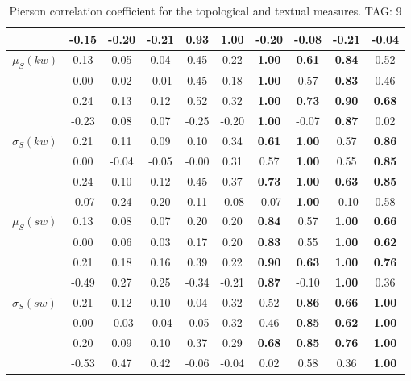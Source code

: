\begin{table*}[h!]
\begin{center}
\begin{tabular}{| l || c | c | c | c | c | c | c | c | c |}
 & -0.15 & -0.20 & -0.21 & {\bf 0.93} & {\bf 1.00} & -0.20 & -0.08 & -0.21 & -0.04 \\\hline
$\mu_S(kw)$ & 0.13 & 0.05 & 0.04 & 0.45 & 0.22 & {\bf 1.00} & {\bf 0.61} & {\bf 0.84} & 0.52 \\
 & 0.00 & 0.02 & -0.01 & 0.45 & 0.18 & {\bf 1.00} & 0.57 & {\bf 0.83} & 0.46 \\
 & 0.24 & 0.13 & 0.12 & 0.52 & 0.32 & {\bf 1.00} & {\bf 0.73} & {\bf 0.90} & {\bf 0.68} \\
 & -0.23 & 0.08 & 0.07 & -0.25 & -0.20 & {\bf 1.00} & -0.07 & {\bf 0.87} & 0.02 \\\hline
$\sigma_S(kw)$ & 0.21 & 0.11 & 0.09 & 0.10 & 0.34 & {\bf 0.61} & {\bf 1.00} & 0.57 & {\bf 0.86} \\
 & 0.00 & -0.04 & -0.05 & -0.00 & 0.31 & 0.57 & {\bf 1.00} & 0.55 & {\bf 0.85} \\
 & 0.24 & 0.10 & 0.12 & 0.45 & 0.37 & {\bf 0.73} & {\bf 1.00} & {\bf 0.63} & {\bf 0.85} \\
 & -0.07 & 0.24 & 0.20 & 0.11 & -0.08 & -0.07 & {\bf 1.00} & -0.10 & 0.58 \\\hline
$\mu_S(sw)$ & 0.13 & 0.08 & 0.07 & 0.20 & 0.20 & {\bf 0.84} & 0.57 & {\bf 1.00} & {\bf 0.66} \\
 & 0.00 & 0.06 & 0.03 & 0.17 & 0.20 & {\bf 0.83} & 0.55 & {\bf 1.00} & {\bf 0.62} \\
 & 0.21 & 0.18 & 0.16 & 0.39 & 0.22 & {\bf 0.90} & {\bf 0.63} & {\bf 1.00} & {\bf 0.76} \\
 & -0.49 & 0.27 & 0.25 & -0.34 & -0.21 & {\bf 0.87} & -0.10 & {\bf 1.00} & 0.36 \\\hline
$\sigma_S(sw)$ & 0.21 & 0.12 & 0.10 & 0.04 & 0.32 & 0.52 & {\bf 0.86} & {\bf 0.66} & {\bf 1.00} \\
 & 0.00 & -0.03 & -0.04 & -0.05 & 0.32 & 0.46 & {\bf 0.85} & {\bf 0.62} & {\bf 1.00} \\
 & 0.20 & 0.09 & 0.10 & 0.37 & 0.29 & {\bf 0.68} & {\bf 0.85} & {\bf 0.76} & {\bf 1.00} \\
 & -0.53 & 0.47 & 0.42 & -0.06 & -0.04 & 0.02 & 0.58 & 0.36 & {\bf 1.00} \\\hline
\end{tabular}
\caption{Pierson correlation coefficient for the topological and textual measures. TAG: 9}
\end{center}
\end{table*}
